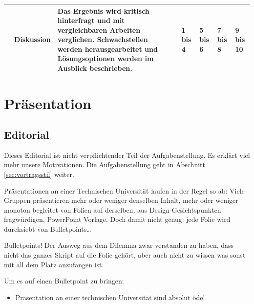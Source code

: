 \documentclass[DIV=15,headinclude=true]{scrreprt}
\begin{document}
{\begin{landscape}
\begin{table}[]
{\begin{tabulary}{\linewidth}{lJJJJJJ}
					& Diskussion                            & Das Ergebnis wird kritisch hinterfragt und mit vergleichbaren Arbeiten verglichen. Schwachstellen werden herausgearbeitet und Lösungsoptionen werden im Ausblick beschrieben.    & 1 bis 4                                                                                                                       & 5 bis 6                                                                                             & 7 bis 8                                        & 9 bis 10               \\


					\bottomrule
				\end{tabulary}
			}
		\end{table}
	\end{landscape}
	\clearpage%
}


\chapter{Präsentation}
\label{präsentation}

\section*{Editorial}

\begin{framed}
	Dieses Editorial ist nicht verpflichtender Teil der Aufgabenstellung. Es erklärt viel mehr unsere Motivationen. Die Aufgabenstellung geht in Abschnitt \ref{sec:vortragsstil} weiter.
\end{framed}


Präsentationen an einer Technischen Universität laufen in der Regel so
ab: Viele Gruppen präsentieren mehr oder weniger denselben Inhalt, mehr
oder weniger monoton begleitet von Folien auf derselben, aus
Design-Gesichtspunkten fragwürdigen, PowerPoint Vorlage. Doch damit
nicht genug: jede Folie wird durchsiebt von Bulletpoints\ldots{}

Bulletpoints! Der Ausweg aus dem Dilemma zwar verstanden zu haben, dass
nicht das ganzes Skript auf die Folie gehört, aber auch nicht zu wissen
was sonst mit all dem Platz anzufangen ist.

Um es auf einen Bulletpoint zu bringen:

\begin{itemize}
	\item
	      Präsentation an einer technischen Universität sind absolut öde!
\end{itemize}
\end{document}
